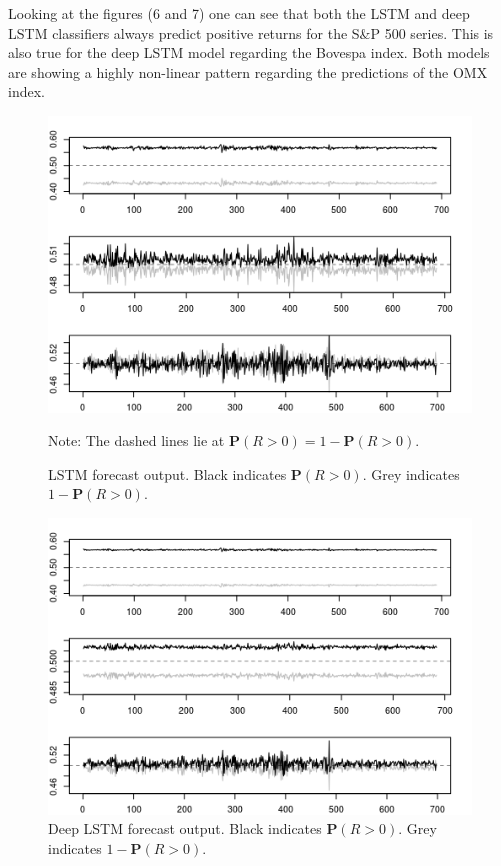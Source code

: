 \documentclass[12pt, letterpaper]{amsart}%
\begin{document}
Looking at the figures (6 and 7) one can see that both the LSTM and deep LSTM classifiers always predict positive returns for the S\&P 500 series. This is also true for the deep LSTM model regarding the Bovespa index. Both models are showing a highly non-linear pattern regarding the predictions of the OMX index.

\begin{figure}[h]%
\caption{LSTM forecast output. Black indicates $\mathbf{P}(R>0)$. Grey indicates $1 - \mathbf{P}(R>0)$.}
\centering
\includegraphics[scale=1]{lstm_prob2.png}
	\begin{tablenotes}
	\item Note: The dashed lines lie at $\mathbf{P}(R>0) = 1 - \mathbf{P}(R>0)$.
	\end{tablenotes}
\end{figure}

\begin{figure}[h]%
\caption{Deep LSTM forecast output. Black indicates $\mathbf{P}(R>0)$. Grey indicates $1 - \mathbf{P}(R>0)$.}
\centering
\includegraphics[scale=1]{lstm_deep_prob2.png}
\end{figure}
\end{document}

